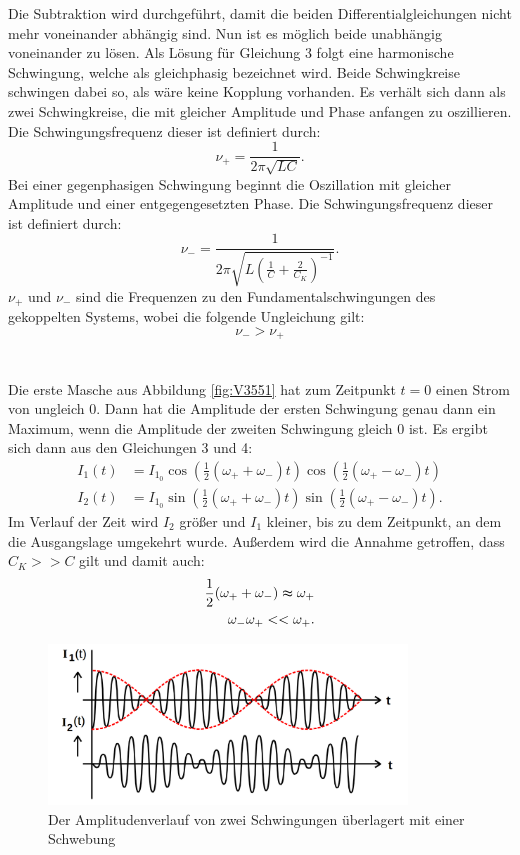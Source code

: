 \documentclass[
  bibliography=totoc,     %
  captions=tableheading,  %
  titlepage=firstiscover, %
]{scrartcl}
\begin{document}
Die Subtraktion wird durchgeführt, damit die beiden Differentialgleichungen nicht
mehr voneinander abhängig sind. Nun ist es möglich beide unabhängig voneinander
zu lösen. Als Lösung für Gleichung 3 folgt eine harmonische Schwingung, welche
als gleichphasig bezeichnet wird. Beide Schwingkreise schwingen dabei so, als
wäre keine Kopplung vorhanden. Es verhält sich dann als zwei Schwingkreise, die
mit gleicher Amplitude und Phase anfangen zu oszillieren. Die
Schwingungsfrequenz dieser ist definiert durch:
\begin{equation}
  \nu_+=\frac{1}{2\pi\sqrt{LC}}.
\end{equation}
Bei einer gegenphasigen Schwingung beginnt die Oszillation mit gleicher
Amplitude und einer entgegengesetzten Phase. Die Schwingungsfrequenz dieser
ist definiert durch:
\begin{equation}
  \nu_-=\frac{1}{2\pi\sqrt{L(\frac{1}{C}+\frac{2}{C_K})^{-1}}}.
\end{equation}
$\nu_+$ und $\nu_-$ sind die Frequenzen zu den Fundamentalschwingungen des
gekoppelten Systems, wobei die folgende Ungleichung gilt:
\begin{equation}
  \nu_->\nu_+
\end{equation} \\
\\
Die erste Masche aus Abbildung \ref{fig:V3551} hat zum Zeitpunkt $t=0$ einen
Strom von ungleich 0. Dann hat die Amplitude der ersten Schwingung genau dann
ein Maximum, wenn die Amplitude der zweiten Schwingung gleich 0 ist. Es
ergibt sich dann aus den Gleichungen 3 und 4:
\begin{align}
  I_1(t) &=I_{1_0}\cos(\frac{1}{2}(\omega_++\omega_-)t)\cos(\frac{1}{2}(\omega_+-\omega_-)t) \\
  I_2(t) &=I_{1_0}\sin(\frac{1}{2}(\omega_++\omega_-)t)\sin(\frac{1}{2}(\omega_+-\omega_-)t).
\end{align}
Im Verlauf der Zeit wird $I_2$ größer und $I_1$ kleiner, bis zu dem Zeitpunkt, an
dem die Ausgangslage umgekehrt wurde. Außerdem wird die Annahme getroffen, dass
$C_K>>C$ gilt und damit auch:
\begin{align}
  \frac{1}{2}(\omega_++\omega_-)\thickapprox\omega_+ \\
  \omega_-\omega_+<<\omega_+.
\end{align}
\begin{figure}[htb]
  \centering
  \includegraphics[width=0.85\textwidth]{V3552.png}
  \caption{Der Amplitudenverlauf von zwei Schwingungen überlagert mit einer Schwebung}
  \label{fig:V3552}
\end{figure}
\end{document}
